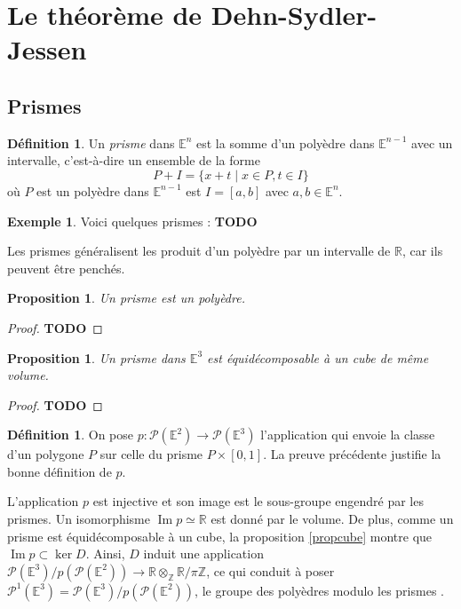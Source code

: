 \documentclass{article}
\newcommand{\Z}{\mathbb{Z}}
\newcommand{\R}{\mathbb{R}}
\newcommand{\E}{\mathbb{E}}
\renewcommand{\P}{\mathcal{P}}
\newcommand{\todo}{\textbf{TODO}}
\renewcommand{\Im}{\mathop{\mathrm{Im}}}
\theoremstyle{plain}
\newtheorem{proposition}[theorem]{Proposition}
\theoremstyle{definition}
\newtheorem{definition}[theorem]{Définition}
\newtheorem{example}[theorem]{Exemple}
\theoremstyle{remark}
\begin{document}
\section{Le théorème de Dehn-Sydler-Jessen}

\subsection{Prismes}

\begin{definition}
    Un \emph{prisme} dans $\E^n$ est la somme d'un polyèdre dans $\E^{n-1}$ avec un intervalle, c'est-à-dire un ensemble de la forme
    \[P + I = \{x + t \mid x \in P, t \in I\}\]
    où $P$ est un polyèdre dans $\E^{n-1}$ est $I = [a,b]$ avec $a,b \in \E^n$.
\end{definition}

\begin{example}
    Voici quelques prismes : \todo
\end{example}

Les prismes généralisent les produit d'un polyèdre par un intervalle de $\R$, car ils peuvent être penchés.

\begin{proposition}
    Un prisme est un polyèdre.
\end{proposition}

\begin{proof}
    \todo
\end{proof}

\begin{proposition}
    Un prisme dans $\E^3$ est équidécomposable à un cube de même volume.
\end{proposition}

\begin{proof}
    \todo
\end{proof}

\begin{definition}
    On pose $p : \P(\E^2) \to \P(\E^3)$ l'application qui envoie la classe d'un polygone $P$ sur celle du prisme $P\times [0,1]$. La preuve précédente justifie la bonne définition de $p$.
\end{definition} 

L'application $p$ est injective et son image est le sous-groupe engendré par les prismes. Un isomorphisme $\Im p \simeq \R$ est donné par le volume. De plus, comme un prisme est équidécomposable à un cube, la proposition \ref{propcube} montre que $\Im p \subset \ker D$. Ainsi, $D$ induit une application $\P(\E^3)/p(\P(\E^2)) \to \R \otimes_\Z \R/\pi\Z$, ce qui conduit à poser $\P^1(\E^3) = \P(\E^3)/p(\P(\E^2))$, le groupe des \og polyèdres modulo les prismes \fg.
\end{document}
